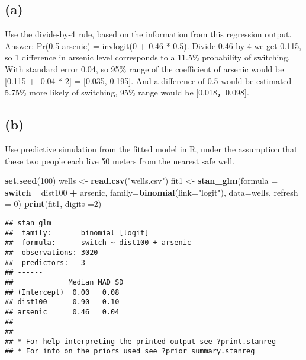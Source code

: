 \documentclass[
]{article}
\newenvironment{Shaded}{\begin{snugshade}}{\end{snugshade}}
\newcommand{\ControlFlowTok}[1]{\textcolor[rgb]{0.13,0.29,0.53}{\textbf{#1}}}
\newcommand{\DataTypeTok}[1]{\textcolor[rgb]{0.13,0.29,0.53}{#1}}
\newcommand{\DecValTok}[1]{\textcolor[rgb]{0.00,0.00,0.81}{#1}}
\newcommand{\KeywordTok}[1]{\textcolor[rgb]{0.13,0.29,0.53}{\textbf{#1}}}
\newcommand{\NormalTok}[1]{#1}
\newcommand{\OperatorTok}[1]{\textcolor[rgb]{0.81,0.36,0.00}{\textbf{#1}}}
\newcommand{\StringTok}[1]{\textcolor[rgb]{0.31,0.60,0.02}{#1}}
\begin{document}
\hypertarget{a}{%
\subsection{(a)}\label{a}}

Use the divide-by-4 rule, based on the information from this regression
output.\\
Answer: Pr(0.5 arsenic) = invlogit(0 + 0.46 * 0.5). Divide 0.46 by 4 we
get 0.115, so 1 difference in arsenic level corresponds to a 11.5\%
probability of switching. With standard error 0.04, so 95\% range of the
coefficient of arsenic would be {[}0.115 +- 0.04 * 2{]} = {[}0.035,
0.195{]}. And a difference of 0.5 would be estimated 5.75\% more likely
of switching, 95\% range would be {[}0.018，0.098{]}.

\hypertarget{b}{%
\subsection{(b)}\label{b}}

Use predictive simulation from the fitted model in R, under the
assumption that these two people each live 50 meters from the nearest
safe well.

\begin{Shaded}
\begin{Highlighting}[]
\KeywordTok{set.seed}\NormalTok{(}\DecValTok{100}\NormalTok{)}
\NormalTok{wells <-}\StringTok{ }\KeywordTok{read.csv}\NormalTok{(}\StringTok{"wells.csv"}\NormalTok{)}
\NormalTok{fit1 <-}\StringTok{ }\KeywordTok{stan_glm}\NormalTok{(}\DataTypeTok{formula =} \ControlFlowTok{switch} \OperatorTok{~}\StringTok{ }\NormalTok{dist100 }\OperatorTok{+}\StringTok{ }\NormalTok{arsenic, }\DataTypeTok{family=}\KeywordTok{binomial}\NormalTok{(}\DataTypeTok{link=}\StringTok{"logit"}\NormalTok{),  }\DataTypeTok{data=}\NormalTok{wells, }\DataTypeTok{refresh =} \DecValTok{0}\NormalTok{)}
\KeywordTok{print}\NormalTok{(fit1, }\DataTypeTok{digits =}\DecValTok{2}\NormalTok{)}
\end{Highlighting}
\end{Shaded}

\begin{verbatim}
## stan_glm
##  family:       binomial [logit]
##  formula:      switch ~ dist100 + arsenic
##  observations: 3020
##  predictors:   3
## ------
##             Median MAD_SD
## (Intercept)  0.00   0.08 
## dist100     -0.90   0.10 
## arsenic      0.46   0.04 
## 
## ------
## * For help interpreting the printed output see ?print.stanreg
## * For info on the priors used see ?prior_summary.stanreg
\end{verbatim}
\end{document}
